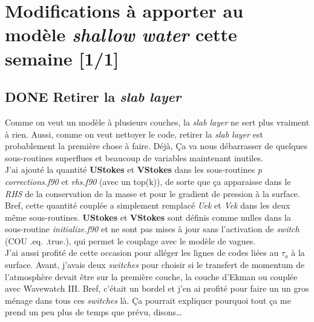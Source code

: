\documentclass{article}
\numberwithin{equation}{section}
\begin{document}
\section{Modifications à apporter au modèle \emph{shallow water} cette semaine [1/1]}
\label{sec:org41374ae}
\subsection{{\bfseries\sffamily DONE} Retirer la \emph{slab layer}}
\label{sec:orga60fae1}
Comme on veut un modèle à plusieurs couches, la \emph{slab layer} ne sert plus vraiment à rien.
Aussi, comme on veut nettoyer le code, retirer la \emph{slab layer} est probablement la première chose à faire. 
Déjà, Ça va nous débarrasser de quelques sous-routines superflues et beaucoup de variables maintenant inutiles.\\[0pt]

J'ai ajouté la quantité \textbf{UStokes} et \textbf{VStokes} dans les sous-routines \emph{p corrections.f90} et \emph{rhs.f90} (avec un top(k)), de sorte que ça apparaisse dans le \emph{RHS} de la conservation de la masse et pour le gradient de pression à la surface. 
Bref, cette quantité couplée a simplement remplacé \emph{Uek} et \emph{Vek} dans les deux même sous-routines.
\textbf{UStokes} et \textbf{VStokes} sont définis comme nulles dans la sous-routine \emph{initialize.f90} et ne sont pas mises à jour sans l'activation de \emph{switch} (COU .eq. .true.), qui permet le couplage avec le modèle de vagues.\\[0pt]

J'ai aussi profité de cette occasion pour alléger les lignes de codes liées au \(\tau_o\) à la surface. 
Avant, j'avais deux \emph{switches} pour choisir si le transfert de momentum de l'atmosphère devait être sur la première couche, la couche d'Ekman ou couplée avec Wavewatch III.
Bref, c'était un bordel et j'en ai profité pour faire un un gros ménage dans tous ces \emph{switches} là.
Ça pourrait expliquer pourquoi tout ça me prend un peu plus de temps que prévu, disons\ldots{}\\[0pt]
\end{document}
